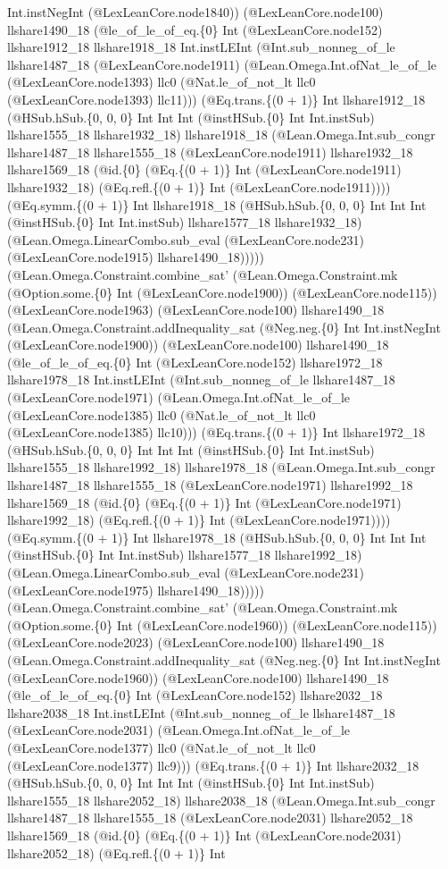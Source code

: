 \documentclass[11pt]{article}
\begin{document}
Int.instNegInt (@LexLeanCore.node1840)) (@LexLeanCore.node100) llshare1490\_18 (@le\_of\_le\_of\_eq.\{0\} Int (@LexLeanCore.node152) llshare1912\_18 llshare1918\_18 Int.instLEInt (@Int.sub\_nonneg\_of\_le llshare1487\_18 (@LexLeanCore.node1911) (@Lean.Omega.Int.ofNat\_le\_of\_le (@LexLeanCore.node1393) llc0 (@Nat.le\_of\_not\_lt llc0 (@LexLeanCore.node1393) llc11))) (@Eq.trans.\{(0 + 1)\} Int llshare1912\_18 (@HSub.hSub.\{0, 0, 0\} Int Int Int (@instHSub.\{0\} Int Int.instSub) llshare1555\_18 llshare1932\_18) llshare1918\_18 (@Lean.Omega.Int.sub\_congr llshare1487\_18 llshare1555\_18 (@LexLeanCore.node1911) llshare1932\_18 llshare1569\_18 (@id.\{0\} (@Eq.\{(0 + 1)\} Int (@LexLeanCore.node1911) llshare1932\_18) (@Eq.refl.\{(0 + 1)\} Int (@LexLeanCore.node1911)))) (@Eq.symm.\{(0 + 1)\} Int llshare1918\_18 (@HSub.hSub.\{0, 0, 0\} Int Int Int (@instHSub.\{0\} Int Int.instSub) llshare1577\_18 llshare1932\_18) (@Lean.Omega.LinearCombo.sub\_eval (@LexLeanCore.node231) (@LexLeanCore.node1915) llshare1490\_18))))) (@Lean.Omega.Constraint.combine\_sat' (@Lean.Omega.Constraint.mk (@Option.some.\{0\} Int (@LexLeanCore.node1900)) (@LexLeanCore.node115)) (@LexLeanCore.node1963) (@LexLeanCore.node100) llshare1490\_18 (@Lean.Omega.Constraint.addInequality\_sat (@Neg.neg.\{0\} Int Int.instNegInt (@LexLeanCore.node1900)) (@LexLeanCore.node100) llshare1490\_18 (@le\_of\_le\_of\_eq.\{0\} Int (@LexLeanCore.node152) llshare1972\_18 llshare1978\_18 Int.instLEInt (@Int.sub\_nonneg\_of\_le llshare1487\_18 (@LexLeanCore.node1971) (@Lean.Omega.Int.ofNat\_le\_of\_le (@LexLeanCore.node1385) llc0 (@Nat.le\_of\_not\_lt llc0 (@LexLeanCore.node1385) llc10))) (@Eq.trans.\{(0 + 1)\} Int llshare1972\_18 (@HSub.hSub.\{0, 0, 0\} Int Int Int (@instHSub.\{0\} Int Int.instSub) llshare1555\_18 llshare1992\_18) llshare1978\_18 (@Lean.Omega.Int.sub\_congr llshare1487\_18 llshare1555\_18 (@LexLeanCore.node1971) llshare1992\_18 llshare1569\_18 (@id.\{0\} (@Eq.\{(0 + 1)\} Int (@LexLeanCore.node1971) llshare1992\_18) (@Eq.refl.\{(0 + 1)\} Int (@LexLeanCore.node1971)))) (@Eq.symm.\{(0 + 1)\} Int llshare1978\_18 (@HSub.hSub.\{0, 0, 0\} Int Int Int (@instHSub.\{0\} Int Int.instSub) llshare1577\_18 llshare1992\_18) (@Lean.Omega.LinearCombo.sub\_eval (@LexLeanCore.node231) (@LexLeanCore.node1975) llshare1490\_18))))) (@Lean.Omega.Constraint.combine\_sat' (@Lean.Omega.Constraint.mk (@Option.some.\{0\} Int (@LexLeanCore.node1960)) (@LexLeanCore.node115)) (@LexLeanCore.node2023) (@LexLeanCore.node100) llshare1490\_18 (@Lean.Omega.Constraint.addInequality\_sat (@Neg.neg.\{0\} Int Int.instNegInt (@LexLeanCore.node1960)) (@LexLeanCore.node100) llshare1490\_18 (@le\_of\_le\_of\_eq.\{0\} Int (@LexLeanCore.node152) llshare2032\_18 llshare2038\_18 Int.instLEInt (@Int.sub\_nonneg\_of\_le llshare1487\_18 (@LexLeanCore.node2031) (@Lean.Omega.Int.ofNat\_le\_of\_le (@LexLeanCore.node1377) llc0 (@Nat.le\_of\_not\_lt llc0 (@LexLeanCore.node1377) llc9))) (@Eq.trans.\{(0 + 1)\} Int llshare2032\_18 (@HSub.hSub.\{0, 0, 0\} Int Int Int (@instHSub.\{0\} Int Int.instSub) llshare1555\_18 llshare2052\_18) llshare2038\_18 (@Lean.Omega.Int.sub\_congr llshare1487\_18 llshare1555\_18 (@LexLeanCore.node2031) llshare2052\_18 llshare1569\_18 (@id.\{0\} (@Eq.\{(0 + 1)\} Int (@LexLeanCore.node2031) llshare2052\_18) (@Eq.refl.\{(0 + 1)\} Int 
\end{document}
